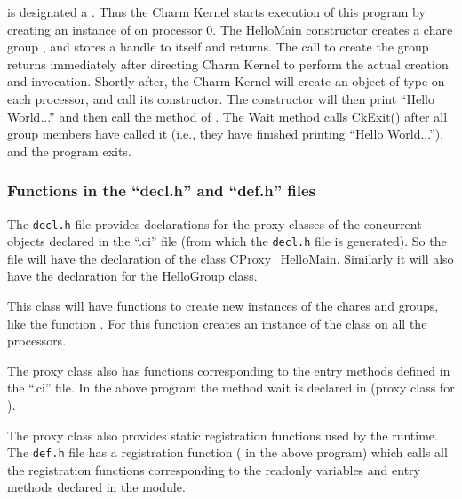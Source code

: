  is designated a . Thus the Charm Kernel starts
execution of this program by creating an instance of  on
processor 0. The HelloMain constructor creates a chare group ,
and stores a handle to itself and returns. The call to create the group returns
immediately after directing Charm Kernel to perform the actual creation and
invocation.  Shortly after, the Charm Kernel will create an object of type
 on each processor, and call its constructor. The constructor
will then print ``Hello World...'' and then call the  method of
. The Wait method calls CkExit() after all group members have
called it (i.e., they have finished printing ``Hello World...''), and the
\charmpp program exits.

\subsubsection{Functions in the ``decl.h'' and ``def.h'' files}

The \texttt{decl.h} file provides declarations for the proxy classes of the
concurrent objects declared in the ``.ci'' file (from which the \texttt{decl.h}
file is generated). So the  file will have the declaration of
the class CProxy\_HelloMain. Similarly it will also have the declaration for
the HelloGroup class. 

This class will have functions to create new instances of the chares and
groups, like the function . For  this function creates
an instance of the class  on all the processors. 

The proxy class also has functions corresponding to the entry methods defined
in the ``.ci'' file. In the above program the method wait is declared in
 (proxy class for ).

The proxy class also provides static registration functions used by the
\charmpp{} runtime.  The \texttt{def.h} file has a registration function
( in the above program) which calls all the registration
functions corresponding to the readonly variables and entry methods declared in
the module.


